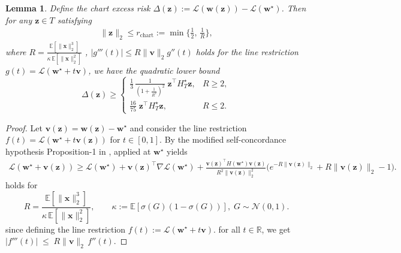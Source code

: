 \documentclass{article}
\theoremstyle{plain}
\newtheorem{lemma}[theorem]{Lemma}
\theoremstyle{definition}
\theoremstyle{remark}
\begin{document}
{\begin{lemma}
\label{lem:chart_quadratic_lower}
Define the chart excess risk $\Delta(\mathbf z):=\mathcal L(\mathbf w(\mathbf z))-\mathcal L(\mathbf w^\star)$. Then for any $\mathbf z\in T$ satisfying
\begin{align}
\|\mathbf z\|_2 \le r_{\mathrm{chart}}
:= \min\Big\{\frac{1}{2},\,\frac{1}{R}\Big\}, \label{eq:chart_radius}
\end{align}
where $R=\frac{\mathbb E[\|\mathbf{x}\|_2^3]}{\kappa\,\mathbb E[\|\mathbf{x}\|_2^2]}$ , 
$|g'''(t)|\le R\|\mathbf v\|_2 g''(t)$ holds for the line restriction
$g(t)=\mathcal L(\mathbf w^\star+t\mathbf v)$,
we have the quadratic lower bound
\[
\Delta(\mathbf{z})\ge
\begin{cases}
\displaystyle
\frac{1}{3}\,\frac{1}{\left(1+\frac{1}{R^2}\right)^2}\;
\mathbf{z}^\top H_T^\star \mathbf{z},
& R\ge 2, \\[1.2ex]
\displaystyle
\frac{16}{75}\;
\mathbf{z}^\top H_T^\star \mathbf{z} ,
& R\le 2.
\end{cases}
\]
\end{lemma}

\begin{proof}
Let $\mathbf v(\mathbf z)=\mathbf w(\mathbf z)-\mathbf w^\star$ and consider the line restriction
$f(t)=\mathcal L(\mathbf w^\star+t\mathbf v(\mathbf z) )$ for $t\in[0,1]$.
By the modified self-concordance hypothesis Proposition-1 in \cite{bach2010self}, applied at $\mathbf w^\star$ yields
\begin{align}
\mathcal L(\mathbf w^\star+\mathbf v(\mathbf z))\ge \mathcal L(\mathbf w^\star)+ \mathbf v(\mathbf z)^\top\nabla\mathcal L(\mathbf w^\star)
+\frac{\mathbf v(\mathbf z)^\top H(\mathbf w^\star)\mathbf v(\mathbf z)}{R^2\|\mathbf v(\mathbf z)\|_2^2}\Big(e^{-R\|\mathbf v(\mathbf z)\|_2}+R\|\mathbf v(\mathbf z)\|_2-1\Big).
\end{align}
holds for \[
R
=
\frac{\mathbb E[\|\mathbf x\|_2^3]}
{\kappa\,\mathbb E[\|\mathbf x\|_2^2]},
\qquad
\kappa := \mathbb E[\sigma(G)(1-\sigma(G))],\; G\sim\mathcal N(0,1).
\]
since defining the line restriction $f(t):=\mathcal L(\mathbf w^\star+t\mathbf v).$ for all $t\in\mathbb R$, we get $|f'''(t)| \;\le\; R\|\mathbf v\|_2\, f''(t)$. 



\end{proof}}
\end{document}
